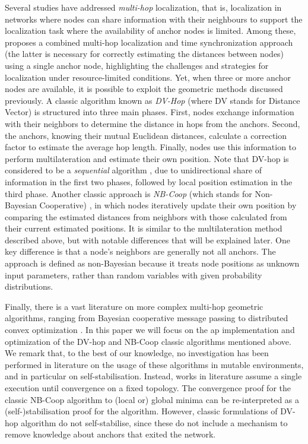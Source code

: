 \documentclass[runningheads]{llncs}
\begin{document}
Several studies have addressed \emph{multi-hop} localization, that is, localization in networks where nodes can share information with their neighbours to support the localization task  where the availability of anchor nodes is limited. Among these, \cite{DBLP:journals/access/ShamsOAK21} proposes a combined multi-hop localization and time synchronization approach (the latter is necessary for correctly estimating the distances between nodes) using a single anchor node, highlighting the challenges and strategies for localization under resource-limited conditions. Yet, when three or more anchor nodes are available, it is possible to exploit the geometric methods discussed previously. 
%
A classic algorithm known as \emph{DV-Hop} \cite{DBLP:journals/telsys/NiculescuN03} (where DV stands for Distance Vector) is structured into three main phases. First, nodes exchange information with their neighbors to determine the distance in hops from the anchors. Second, the anchors, knowing their mutual Euclidean distances, calculate a correction factor to estimate the average hop length. Finally, nodes use this information to perform multilateration and estimate their own position. Note that DV-hop is considered to be a \emph{sequential} algorithm \cite{xwsw:tit22}, due to unidirectional share of information in the first two phases, followed by local position estimation in the third phase.
%
Another classic approach is \emph{NB-Coop} (which stands for Non-Bayesian Cooperative) \cite{DBLP:journals/pieee/WymeerschLW09}, in which nodes iteratively update their own position by comparing the estimated distances from neighbors with those calculated from their current estimated positions. It is similar to the multilateration method described above, but with notable differences that will be explained later. One key difference is that a node’s neighbors are generally not all anchors. The approach is defined as non-Bayesian because it treats node positions as unknown input parameters, rather than random variables with given probability distributions.

Finally, there is a vast literature on more complex multi-hop geometric algorithms, ranging from Bayesian cooperative message passing \cite{DBLP:journals/pieee/WymeerschLW09} to distributed convex optimization \cite{6725647}. In this paper we will focus on the \ac{ap} implementation and optimization of the DV-hop and NB-Coop classic algorithms mentioned above. We remark that, to the best of our knowledge, no investigation has been performed in literature on the usage of these algorithms in mutable environments, and in particular on self-stabilisation. Instead, works in literature assume a single execution until convergence on a fixed topology. The convergence proof for the classic NB-Coop algorithm to (local or) global minima can be re-interpreted as a (self-)stabilisation proof for the algorithm. However, classic formulations of DV-hop algorithm do not self-stabilise, since these do not include a mechanism to remove knowledge about anchors that exited the network.
\end{document}

